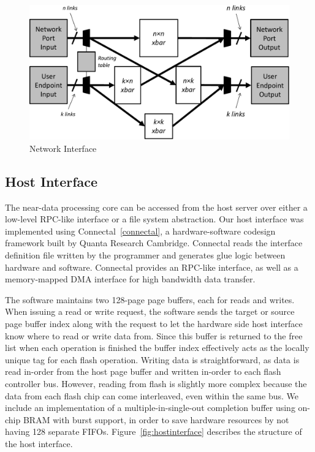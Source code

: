 \begin{figure}[h]
	\begin{center}
	\includegraphics[scale=0.4]{figures/network-routing-crop.pdf}
	\caption{Network Interface}
	\label{fig:networkinterface}
	\end{center}
\end{figure}


\subsection{Host Interface}

The near-data processing core can be accessed from the host server over either a
low-level RPC-like interface or a file system abstraction. Our host interface
was implemented using Connectal~\ref{connectal}, a hardware-software codesign
framework built by Quanta Research Cambridge. Connectal reads the interface
definition file written by the programmer and generates glue logic between
hardware and software. Connectal provides an RPC-like interface, as well as a
memory-mapped DMA interface for high bandwidth data transfer.

The software maintains two 128-page page buffers, each for reads and writes. When
issuing a read or write request, the software sends the target or source page
buffer index along with the request to let the hardware side host interface know
where to read or write data from. Since this buffer is returned to the free list
when each operation is finished the buffer index effectively acts as the locally
unique tag for each flash operation. Writing data is straightforward, as data is
read in-order from the host page buffer and written in-order to each flash
controller bus. However, reading from flash is slightly more complex because the
data from each flash chip can come interleaved, even within the same bus. 
We include an implementation of a multiple-in-single-out completion buffer using
on-chip BRAM with burst support, in order to save hardware resources by not
having 128 separate FIFOs. Figure~\ref{fig:hostinterface} describes the
structure of the host interface.

